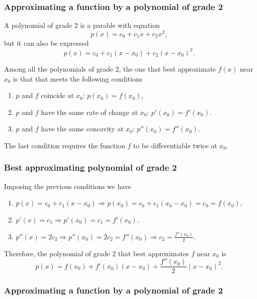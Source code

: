 \begin{frame}
\frametitle{Approximating a function by a polynomial of grade 2}
A polynomial of grade 2 is a parable with equation
\[
p(x) = c_0+c_1x+c_2x^2,
\]
but it can also be expressed
\[
p(x) = c_0+c_1(x-x_0)+c_2(x-x_0)^2.
\]

Among all the polynomials of grade 2, the one that best approximate $f(x)$ near $x_0$ is that that meets the following conditions
\begin{enumerate}
\item $p$ and $f$ coincide at $x_0$: $p(x_0) = f(x_0)$,
\item $p$ and $f$ have the same rate of change at $x_0$: $p'(x_0) = f'(x_0)$.
\item $p$ and $f$ have the same concavity at $x_0$: $p''(x_0)=f''(x_0)$.
\end{enumerate}
The last condition requires the function $f$ to be differentiable twice at $x_0$.
\end{frame}


\begin{frame}
\frametitle{Best approximating polynomial of grade 2}
Imposing the previous conditions we have
\begin{enumerate}
\item $p(x)=c_0+c_1(x-x_0) \Rightarrow p(x_0)=c_0+c_1(x_0-x_0)=c_0=f(x_0)$,
\item $p'(x)=c_1 \Rightarrow p'(x_0)=c_1=f'(x_0)$.
\item $p''(x)=2c_2 \Rightarrow p''(x_0)=2c_2=f''(x_0) \Rightarrow c_2=\frac{f''(x_0)}{2}$.
\end{enumerate}

Therefore, the polynomial of grade 2 that best approximates $f$ near $x_0$ is
\[
p(x) = f(x_0)+f'(x_0)(x-x_0)+\frac{f''(x_0)}{2}(x-x_0)^2.
\]
\end{frame}


\begin{frame}
\frametitle{Approximating a function by a polynomial of grade 2}
\begin{center}

\end{center}
\end{frame}


